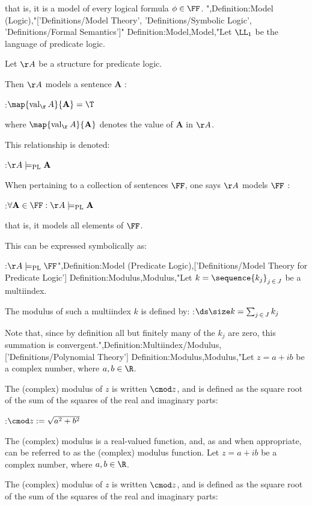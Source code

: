 that is,  it is a model of every logical formula $\phi \in \FF$.
",Definition:Model (Logic),"['Definitions/Model Theory', 'Definitions/Symbolic Logic', 'Definitions/Formal Semantics']"
Definition:Model,Model,"Let $\LL_1$ be the language of predicate logic.

Let $\AA$ be a structure for predicate logic.


Then $\AA$ models a sentence $\mathbf A$ :

:$\map {\operatorname{val}_\AA} {\mathbf A} = \T$

where $\map {\operatorname{val}_\AA} {\mathbf A}$ denotes the value of $\mathbf A$ in $\AA$.


This relationship is denoted:

:$\AA \models_{\mathrm{PL} } \mathbf A$


When pertaining to a collection of sentences $\FF$, one says $\AA$ models $\FF$ :

:$\forall \mathbf A \in \FF: \AA \models_{\mathrm{PL} } \mathbf A$

that is,  it models all elements of $\FF$.

This can be expressed symbolically as:

:$\AA \models_{\mathrm {PL} } \FF$",Definition:Model (Predicate Logic),['Definitions/Model Theory for Predicate Logic']
Definition:Modulus,Modulus,"Let $k = \sequence {k_j}_{j \mathop \in J}$ be a multiindex.


The modulus of such a multiindex $k$  is defined by:
:$\ds \size k = \sum_{j \mathop \in J} k_j$




Note that, since by definition all but finitely many of the $k_j$ are zero, this summation is convergent.",Definition:Multiindex/Modulus,['Definitions/Polynomial Theory']
Definition:Modulus,Modulus,"Let $z = a + i b$ be a complex number, where $a, b \in \R$.


The (complex) modulus of $z$ is written $\cmod z$, and is defined as the square root of the sum of the squares of the real and imaginary parts:

:$\cmod z := \sqrt {a^2 + b^2}$


The (complex) modulus is a real-valued function, and, as and when appropriate, can be referred to as the (complex) modulus function.
Let $z = a + i b$ be a complex number, where $a, b \in \R$.


The (complex) modulus of $z$ is written $\cmod z$, and is defined as the square root of the sum of the squares of the real and imaginary parts:


